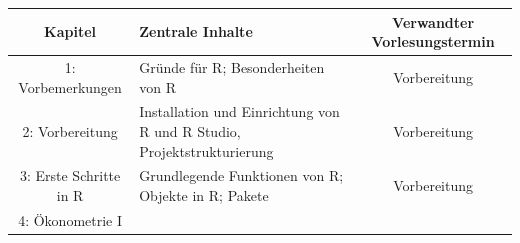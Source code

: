\documentclass[]{book}
\begin{document}
\begin{longtable}[]{@{}clc@{}}
\toprule
\begin{minipage}[b]{0.24\columnwidth}\centering\strut
Kapitel\strut
\end{minipage} & \begin{minipage}[b]{0.34\columnwidth}\raggedright\strut
Zentrale Inhalte\strut
\end{minipage} & \begin{minipage}[b]{0.34\columnwidth}\centering\strut
Verwandter Vorlesungstermin\strut
\end{minipage}\tabularnewline
\midrule
\endhead
\begin{minipage}[t]{0.24\columnwidth}\centering\strut
1: Vorbemerkungen\strut
\end{minipage} & \begin{minipage}[t]{0.34\columnwidth}\raggedright\strut
Gründe für R; Besonderheiten von R\strut
\end{minipage} & \begin{minipage}[t]{0.34\columnwidth}\centering\strut
Vorbereitung\strut
\end{minipage}\tabularnewline
\begin{minipage}[t]{0.24\columnwidth}\centering\strut
2: Vorbereitung\strut
\end{minipage} & \begin{minipage}[t]{0.34\columnwidth}\raggedright\strut
Installation und Einrichtung von R und R Studio,
Projektstrukturierung\strut
\end{minipage} & \begin{minipage}[t]{0.34\columnwidth}\centering\strut
Vorbereitung\strut
\end{minipage}\tabularnewline
\begin{minipage}[t]{0.24\columnwidth}\centering\strut
3: Erste Schritte in R\strut
\end{minipage} & \begin{minipage}[t]{0.34\columnwidth}\raggedright\strut
Grundlegende Funktionen von R; Objekte in R; Pakete\strut
\end{minipage} & \begin{minipage}[t]{0.34\columnwidth}\centering\strut
Vorbereitung\strut
\end{minipage}\tabularnewline
\begin{minipage}[t]{0.24\columnwidth}\centering\strut
4: Ökonometrie I\strut
\end{minipage} & \begin{minipage}[t]{0.34\columnwidth}\raggedright\strut

\end{minipage}
\end{longtable}
\end{document}
